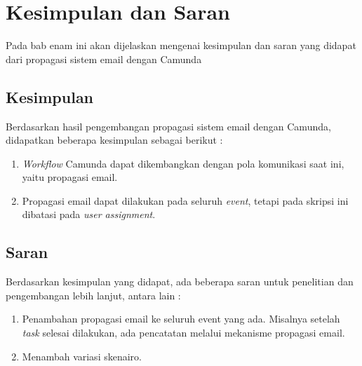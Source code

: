 \chapter{Kesimpulan dan Saran}
\label{chap:kesimpulan_saran}
Pada bab enam ini akan dijelaskan mengenai kesimpulan dan saran yang didapat dari propagasi sistem email dengan Camunda 
\section{Kesimpulan}
\label{sec:kesimpulan}
Berdasarkan hasil pengembangan propagasi sistem email dengan Camunda, didapatkan beberapa kesimpulan sebagai berikut :
\begin{enumerate}
	\item \textit{Workflow} Camunda dapat dikembangkan dengan pola komunikasi saat ini, yaitu propagasi email.
	\item Propagasi email dapat dilakukan pada seluruh \textit{event}, tetapi pada skripsi ini dibatasi pada \textit{user assignment}.
	

\end{enumerate}

\section{Saran}
\label{sec:saran}
Berdasarkan kesimpulan yang didapat, ada beberapa saran untuk penelitian dan pengembangan lebih lanjut, antara lain :
\begin{enumerate}
	\item Penambahan propagasi email ke seluruh event yang ada. Misalnya setelah \textit{task} selesai dilakukan, ada pencatatan melalui mekanisme propagasi email. 
	\item Menambah variasi skenairo.
\end{enumerate}